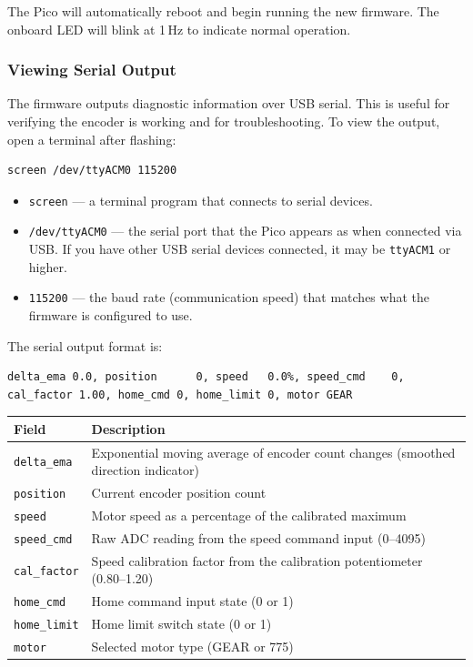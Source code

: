 \documentclass[main.tex]{subfiles}
\begin{document}
\noindent The Pico will automatically reboot and begin running the new firmware. The onboard LED will blink at 1\,Hz to indicate normal operation.

\subsubsection{Viewing Serial Output}

The firmware outputs diagnostic information over USB serial. This is useful for verifying the encoder is working and for troubleshooting. To view the output, open a terminal after flashing:

\begin{verbatim}
screen /dev/ttyACM0 115200
\end{verbatim}

\begin{itemize}
    \item \texttt{screen} --- a terminal program that connects to serial devices.
    \item \texttt{/dev/ttyACM0} --- the serial port that the Pico appears as when connected via USB. If you have other USB serial devices connected, it may be \texttt{ttyACM1} or higher.
    \item \texttt{115200} --- the baud rate (communication speed) that matches what the firmware is configured to use.
\end{itemize}

The serial output format is:
\begin{verbatim}
delta_ema 0.0, position      0, speed   0.0%, speed_cmd    0,
cal_factor 1.00, home_cmd 0, home_limit 0, motor GEAR
\end{verbatim}

\begin{tabularx}{\textwidth}{l X}
\textbf{Field} & \textbf{Description} \\
\hline
\texttt{delta\_ema} & Exponential moving average of encoder count changes (smoothed direction indicator) \\
\texttt{position} & Current encoder position count \\
\texttt{speed} & Motor speed as a percentage of the calibrated maximum \\
\texttt{speed\_cmd} & Raw ADC reading from the speed command input (0--4095) \\
\texttt{cal\_factor} & Speed calibration factor from the calibration potentiometer (0.80--1.20) \\
\texttt{home\_cmd} & Home command input state (0 or 1) \\
\texttt{home\_limit} & Home limit switch state (0 or 1) \\
\texttt{motor} & Selected motor type (GEAR or 775) \\
\end{tabularx}
\end{document}
